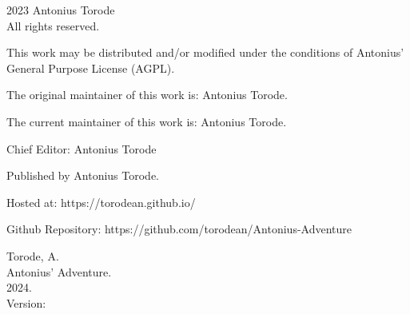 \pagestyle{empty}
\begingroup
\footnotesize
\parindent 0pt
\parskip \baselineskip
\textcopyright{} 2023 Antonius Torode \\
All rights reserved.

This work may be distributed and/or modified under the conditions of Antonius’ General Purpose License (AGPL).

The original maintainer of this work is: Antonius Torode.

The current maintainer of this work is: Antonius Torode.


Chief Editor: Antonius Torode


Published by Antonius Torode. 

Hosted at: https://torodean.github.io/

Github Repository: https://github.com/torodean/Antonius-Adventure


\vfill

Torode, A.\\
\hspace*{1em} Antonius' Adventure. \\
\hspace*{2em} 2024. \\
\hspace*{2em} Version: \Version


\endgroup
\clearpage

